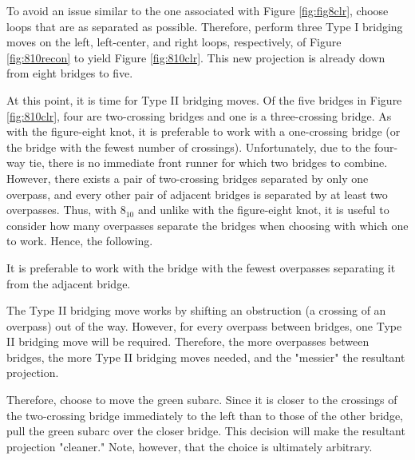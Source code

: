 \documentclass[titlepage]{article}
\begin{document}
To avoid an issue similar to the one associated with Figure \ref{fig:fig8clr}, choose loops that are as separated as possible. Therefore, perform three Type I bridging moves on the left, left-center, and right loops, respectively, of Figure \ref{fig:810recon} to yield Figure \ref{fig:810clr}. This new projection is already down from eight bridges to five.\par
At this point, it is time for Type II bridging moves. Of the five bridges in Figure \ref{fig:810clr}, four are two-crossing bridges and one is a three-crossing bridge. As with the figure-eight knot, it is preferable to work with a one-crossing bridge (or the bridge with the fewest number of crossings). Unfortunately, due to the four-way tie, there is no immediate front runner for which two bridges to combine. However, there exists a pair of two-crossing bridges separated by only one overpass, and every other pair of adjacent bridges is separated by at least two overpasses. Thus, with $8_{10}$ and unlike with the figure-eight knot, it is useful to consider how many overpasses separate the bridges when choosing with which one to work. Hence, the following.\par

\begin{conj}
    It is preferable to work with the bridge with the fewest overpasses separating it from the adjacent bridge.
\end{conj}

The Type II bridging move works by shifting an obstruction (a crossing of an overpass) out of the way. However, for every overpass between bridges, one Type II bridging move will be required. Therefore, the more overpasses between bridges, the more Type II bridging moves needed, and the "messier" the resultant projection.\par
Therefore, choose to move the \textcolor{grx}{green} subarc. Since it is closer to the crossings of the two-crossing bridge immediately to the left than to those of the other bridge, pull the \textcolor{grx}{green} subarc over the closer bridge. This decision will make the resultant projection "cleaner." Note, however, that the choice is ultimately arbitrary.\par
\end{document}
